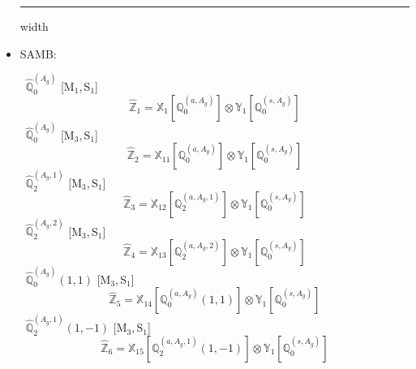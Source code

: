 \documentclass[fleqn,10pt,landscape]{article}
\begin{document}
\begin{itemize}
 \hfil \hrule height 1mm width \textwidth \hfil

\item SAMB:

\vspace{4mm}
\noindent {} $\,\,\,\hat{\mathbb{Q}}_{0}^{(A_{g})}$ [M$_{1}$,\,S$_{1}$]
\begin{dmath*}
\hat{\mathbb{Z}}_{1}=\mathbb{X}_{1}[\mathbb{Q}_{0}^{(a,A_{g})}] \otimes\mathbb{Y}_{1}[\mathbb{Q}_{0}^{(s,A_{g})}]
\end{dmath*}
\vspace{4mm}
\noindent {} $\,\,\,\hat{\mathbb{Q}}_{0}^{(A_{g})}$ [M$_{3}$,\,S$_{1}$]
\begin{dmath*}
\hat{\mathbb{Z}}_{2}=\mathbb{X}_{11}[\mathbb{Q}_{0}^{(a,A_{g})}] \otimes\mathbb{Y}_{1}[\mathbb{Q}_{0}^{(s,A_{g})}]
\end{dmath*}
\vspace{4mm}
\noindent {} $\,\,\,\hat{\mathbb{Q}}_{2}^{(A_{g},1)}$ [M$_{3}$,\,S$_{1}$]
\begin{dmath*}
\hat{\mathbb{Z}}_{3}=\mathbb{X}_{12}[\mathbb{Q}_{2}^{(a,A_{g},1)}] \otimes\mathbb{Y}_{1}[\mathbb{Q}_{0}^{(s,A_{g})}]
\end{dmath*}
\vspace{4mm}
\noindent {} $\,\,\,\hat{\mathbb{Q}}_{2}^{(A_{g},2)}$ [M$_{3}$,\,S$_{1}$]
\begin{dmath*}
\hat{\mathbb{Z}}_{4}=\mathbb{X}_{13}[\mathbb{Q}_{2}^{(a,A_{g},2)}] \otimes\mathbb{Y}_{1}[\mathbb{Q}_{0}^{(s,A_{g})}]
\end{dmath*}
\vspace{4mm}
\noindent {} $\,\,\,\hat{\mathbb{Q}}_{0}^{(A_{g})}(1,1)$ [M$_{3}$,\,S$_{1}$]
\begin{dmath*}
\hat{\mathbb{Z}}_{5}=\mathbb{X}_{14}[\mathbb{Q}_{0}^{(a,A_{g})}(1,1)] \otimes\mathbb{Y}_{1}[\mathbb{Q}_{0}^{(s,A_{g})}]
\end{dmath*}
\vspace{4mm}
\noindent {} $\,\,\,\hat{\mathbb{Q}}_{2}^{(A_{g},1)}(1,-1)$ [M$_{3}$,\,S$_{1}$]
\begin{dmath*}
\hat{\mathbb{Z}}_{6}=\mathbb{X}_{15}[\mathbb{Q}_{2}^{(a,A_{g},1)}(1,-1)] \otimes\mathbb{Y}_{1}[\mathbb{Q}_{0}^{(s,A_{g})}]
\end{dmath*}

\end{itemize}
\end{document}
